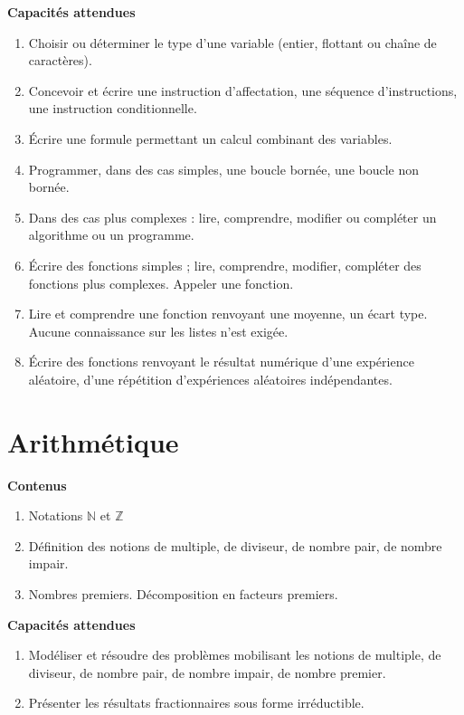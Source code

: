 \documentclass[10pt,a4paper]{article}
\begin{document}
\textbf{Capacités attendues}

\begin{enumerate}
\item Choisir ou déterminer le type d’une variable (entier, flottant ou chaîne de caractères).
\item  Concevoir et écrire une instruction d’affectation, une séquence d’instructions, une 
instruction conditionnelle.
\item  Écrire une formule permettant un calcul combinant des variables.
\item  Programmer, dans des cas simples, une boucle bornée, une boucle non bornée.
\item  Dans des cas plus complexes : lire, comprendre, modifier ou compléter un algorithme 
ou un programme.

\item Écrire des fonctions simples ; lire, comprendre, modifier, compléter des fonctions plus 
complexes. Appeler une fonction.
\item  Lire et comprendre une fonction renvoyant une moyenne, un écart type. Aucune 
connaissance sur les listes n’est exigée.
\item Écrire des fonctions renvoyant le résultat numérique d’une expérience aléatoire, 
d’une répétition d’expériences aléatoires indépendantes.

\end{enumerate}




\section{Arithmétique}

\textbf{Contenus}

\begin{enumerate}
\item Notations $\mathbb{N}$ et $\mathbb{Z}$
\item Définition des notions de multiple, de diviseur, de nombre pair, de nombre impair.
\item Nombres premiers. Décomposition en facteurs premiers.
\end{enumerate}

\textbf{Capacités attendues}

\begin{enumerate}
\item Modéliser et résoudre des problèmes mobilisant les notions de multiple, de diviseur, 
de nombre pair, de nombre impair, de nombre premier.
\item Présenter les résultats fractionnaires sous forme irréductible.
\end{enumerate}
\end{document}
